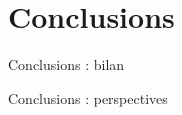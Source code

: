 \section{Conclusions}
\begin{frame}[c]{Conclusions : bilan}

\end{frame}

\begin{frame}[c]{Conclusions : perspectives}
	
\end{frame}